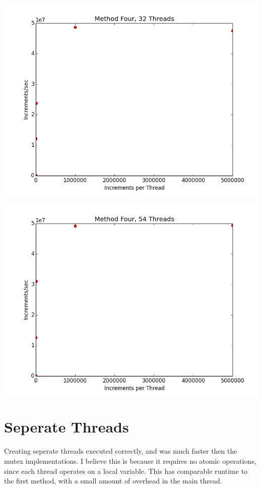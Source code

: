 \documentclass[12pt]{article}
\begin{document}
\includegraphics[scale=.5]{Graphs/MethodFour_32Thread.png}

\includegraphics[scale=.5]{Graphs/MethodFour_54Thread.png}


\section*{Seperate Threads}
Creating seperate threads executed correctly, and was
much faster then the mutex implementations. I believe this is
because it requires no atomic operations, since each thread operates
on a local variable. This has comparable runtime to the first method,
with a small amount of overhead in the main thread.
\end{document}
